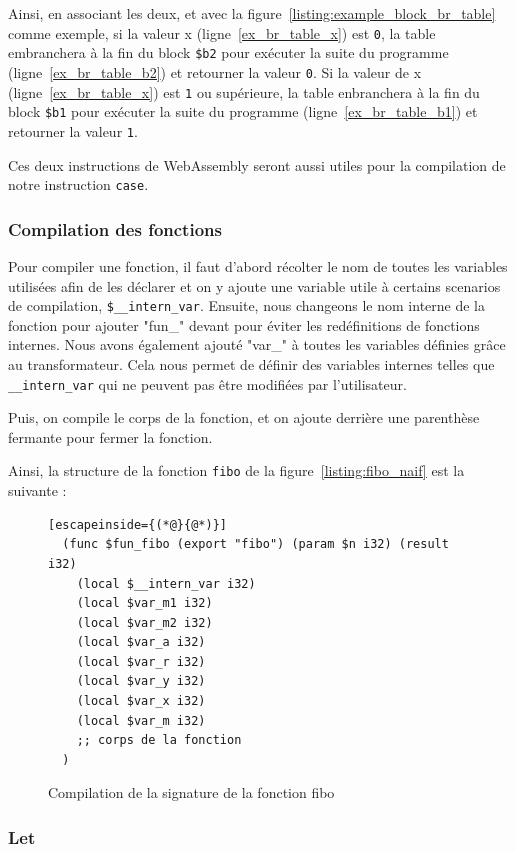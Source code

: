 \documentclass{rapportECL}
\begin{document}
Ainsi, en associant les deux, et avec la figure~\ref{listing:example_block_br_table} comme exemple, si la valeur x (ligne~\ref{ex_br_table_x}) est \verb|0|, la table embranchera à la fin du block \verb|$b2| pour exécuter la suite du programme (ligne~\ref{ex_br_table_b2}) et retourner la valeur \verb|0|. Si la valeur de x (ligne~\ref{ex_br_table_x}) est \verb|1| ou supérieure, la table enbranchera à la fin du block \verb|$b1| pour exécuter la suite du programme (ligne~\ref{ex_br_table_b1}) et retourner la valeur \verb|1|.

Ces deux instructions de WebAssembly seront aussi utiles pour la compilation de notre instruction \verb|case|.

\subsubsection{Compilation des fonctions}

Pour compiler une fonction, il faut d'abord récolter le nom de toutes les variables utilisées afin de les 
déclarer et on y ajoute une variable utile à certains scenarios de compilation, \verb|$__intern_var|.
Ensuite, nous changeons le nom interne de la fonction pour ajouter "fun\_" devant pour éviter les 
redéfinitions de fonctions internes.
Nous avons également ajouté "var\_" à toutes les variables définies grâce au transformateur.
Cela nous permet de définir des variables internes telles que \verb|__intern_var| qui ne peuvent pas être modifiées par 
l'utilisateur.

Puis, on compile le corps de la fonction, et on ajoute derrière une parenthèse fermante pour fermer la fonction.

Ainsi, la structure de la fonction \verb|fibo| de la figure~\ref{listing:fibo_naif} est la suivante :
\begin{figure}[H]
	\begin{lstlisting}[escapeinside={(*@}{@*)}]
  (func $fun_fibo (export "fibo") (param $n i32) (result i32)
    (local $__intern_var i32)
    (local $var_m1 i32)
    (local $var_m2 i32)
    (local $var_a i32)
    (local $var_r i32)
    (local $var_y i32)
    (local $var_x i32)
    (local $var_m i32)
    ;; corps de la fonction
  )
	\end{lstlisting}
	\caption{Compilation de la signature de la fonction fibo}
	\label{listing:signature_fibo}
\end{figure}

\subsubsection{Let}
\end{document}
